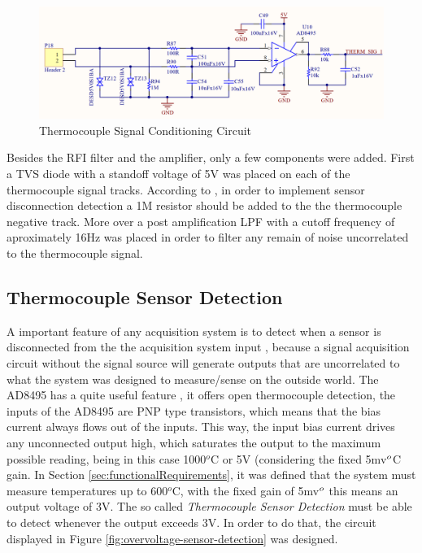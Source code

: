 	\begin{figure}[htbp]
			\centering
				\includegraphics[width=.8\textwidth]{figuras/fig-temperature-acq-cic}
			\caption{Thermocouple Signal Conditioning Circuit}
			\label{fig:temperature-acq-cic}
	\end{figure}

	Besides the RFI filter and the amplifier, only a few components were added. First a TVS diode with a standoff voltage of 5V was placed on each of the thermocouple signal tracks. According to \cite{ad8495-datasheet}, in order to implement sensor disconnection detection a 1M resistor should be added to the the thermocouple negative track. More over a post amplification LPF with a cutoff frequency of aproximately 16Hz was placed in order to filter any remain of noise uncorrelated to the thermocouple signal.
		
	\subsection{Thermocouple Sensor Detection}\label{ssec:thermocouple-sensor-detection}
		
	A important feature of any acquisition system is to detect when a sensor is disconnected from the the acquisition system input \cite{o2011pressure}, because a signal acquisition circuit without the signal source will generate outputs that are uncorrelated to what the system was designed to measure/sense on the outside world. The AD8495 has a quite useful feature \cite{ad8495-datasheet}, it offers open thermocouple detection, the inputs of the AD8495 are PNP type transistors, which means that the bias current always flows out of the inputs. This way, the input bias current drives any unconnected output high, which saturates the output to the maximum possible reading, being in this case 1000$^{o}$C or 5V (considering the fixed 5mv$\/ ^{o}$C gain. In Section \ref{sec:functionalRequirements}, it was defined that the system must measure temperatures up to 600$^{o}$C, with the fixed gain of 5mv$\/^{o}$ this means an output voltage of 3V. The so called \textit{Thermocouple Sensor Detection} must be able to detect whenever the output exceeds 3V. In order to do that, the circuit displayed in Figure \ref{fig:overvoltage-sensor-detection} was designed.
	
